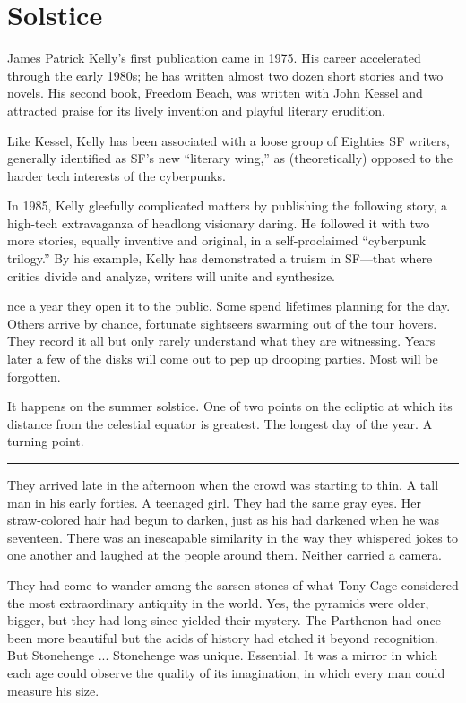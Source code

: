 \chapter{Solstice}

James Patrick Kelly's first publication came in 1975. His career accelerated through the early 1980s; he has written almost two dozen short stories and two novels. His second book, Freedom Beach, was written with John Kessel and attracted praise for its lively invention and playful literary erudition.

Like Kessel, Kelly has been associated with a loose group of Eighties SF writers, generally identified as SF's new ``literary wing,'' as (theoretically) opposed to the harder tech interests of the cyberpunks.

In 1985, Kelly gleefully complicated matters by publishing the following story, a high-tech extravaganza of headlong visionary daring. He followed it with two more stories, equally inventive and original, in a self-proclaimed ``cyberpunk trilogy.'' By his example, Kelly has demonstrated a truism in SF---that where critics divide and analyze, writers will unite and synthesize.

\hrulefill

nce a year they open it to the public. Some spend lifetimes planning for the day. Others arrive by chance, fortunate sightseers swarming out of the tour hovers. They record it all but only rarely understand what they are witnessing. Years later a few of the disks will come out to pep up drooping parties. Most will be forgotten.

It happens on the summer solstice. One of two points on the ecliptic at which its distance from the celestial equator is greatest. The longest day of the year. A turning point.

\fancybreak{* * *}

They arrived late in the afternoon when the crowd was starting to thin. A tall man in his early forties. A teenaged girl. They had the same gray eyes. Her straw-colored hair had begun to darken, just as his had darkened when he was seventeen. There was an inescapable similarity in the way they whispered jokes to one another and laughed at the people around them. Neither carried a camera.

They had come to wander among the sarsen stones of what Tony Cage considered the most extraordinary antiquity in the world. Yes, the pyramids were older, bigger, but they had long since yielded their mystery. The Parthenon had once been more beautiful but the acids of history had etched it beyond recognition. But Stonehenge ... Stonehenge was unique. Essential. It was a mirror in which each age could observe the quality of its imagination, in which every man could measure his size.

